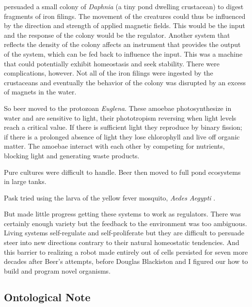 \citet{beer1962progress}
persuaded a small colony of \textit{Daphnia} (a tiny pond dwelling crustacean) to digest fragments of iron filings.
The movement of the creatures could thus be influenced by 
the direction and strength of applied magnetic fields.
This would be the input and the response of the colony would be the regulator.
Another system that reflects the density of the colony affects an instrument that provides the output of the system, which can be fed back to influence the input.
This was a machine that could potentially exhibit homeostasis and seek stability.
There were complications, however.
Not all of the iron filings were ingested by the crustaceans and eventually the behavior of the colony was disrupted by an excess of magnets in the water.

So beer moved to the protozoan \textit{Euglena}.
These amoebae photosynthesize in water and are sensitive to light, their
phototropism reversing when light levels reach a critical value. 
If there is sufficient light they reproduce by binary fission; if there is a prolonged absence of light they lose chlorophyll and live off organic matter. 
The amoebae interact with each other by competing for nutrients, blocking light and generating waste products.

Pure cultures were difficult to handle.
Beer then moved to full pond ecosystems in large tanks.

Pask tried using the larva of the yellow fever mosquito, \textit{Aedes Aegypti} \cite{beer1962progress}.

But made little progress getting these systems to work as regulators.
There was certainly enough variety but the feedback to the environment was too ambiguous.
Living systems self-regulate and self-proliferate but they are difficult to persuade steer into new directions contrary to their natural homeostatic tendencies.
And this barrier to realizing a robot made entirely out of cells persisted for seven more decades after Beer's attempts, before Douglas Blackiston and I figured our how to build and program novel organisms.


\subsection{Ontological Note}


